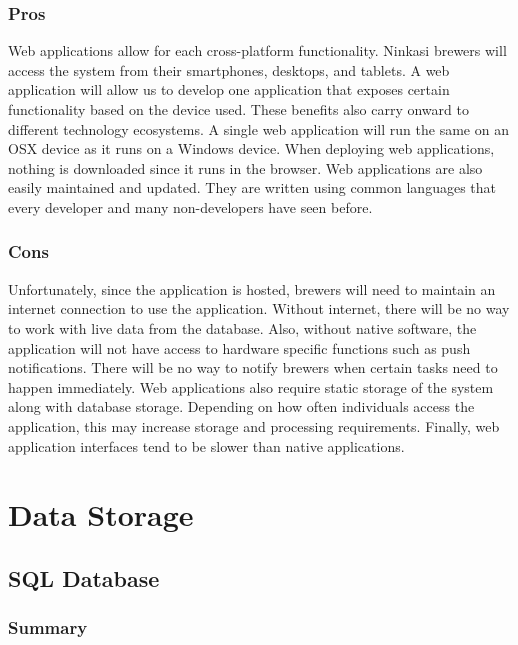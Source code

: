 \documentclass[draftclsnofoot,onecolumn,letterpaper,10pt,compsoc]{IEEEtran}
\begin{document}
        \subsubsection{Pros}
            Web applications allow for each cross-platform functionality.
            Ninkasi brewers will access the system from their smartphones, desktops, and tablets.
            A web application will allow us to develop one application that exposes certain functionality based on the device used.
            These benefits also carry onward to different technology ecosystems.
            A single web application will run the same on an OSX device as it runs on a Windows device.
            When deploying web applications, nothing is downloaded since it runs in the browser.
            Web applications are also easily maintained and updated.
            They are written using common languages that every developer and many non-developers have seen before.
    
        \subsubsection{Cons}
            Unfortunately, since the application is hosted, brewers will need to maintain an internet connection to use the application.
            Without internet, there will be no way to work with live data from the database.
            Also, without native software, the application will not have access to hardware specific functions such as push notifications.
            There will be no way to notify brewers when certain tasks need to happen immediately.
            Web applications also require static storage of the system along with database storage.
            Depending on how often individuals access the application, this may increase storage and processing requirements.
            Finally, web application interfaces tend to be slower than native applications\cite{LifeWireOverview}.


\section{Data Storage}
	\subsection{SQL Database}
        \subsubsection{Summary}
    
\end{document}
